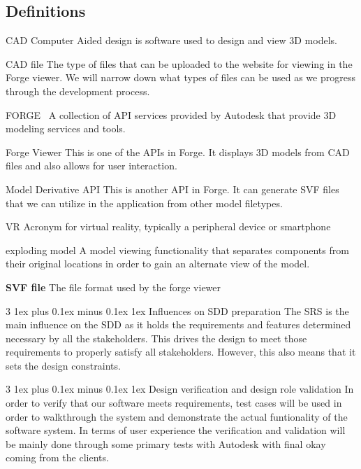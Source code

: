 \documentclass[letterpaper, 10pt, draftclsnofoot, compsoc, onecolumn]{IEEEtran}
\makeatletter
\def\subsubsection{\@startsection{subsubsection}%
                                 {3}%
                                 {\z@}%
                                 {1ex plus 0.1ex minus 0.1ex}%
                                 {1ex}%
                                 {\normalfont\normalsize}}%
\makeatother
\begin{document}
\subsection{Definitions}
\begin{description}
	\item{CAD} Computer Aided design is software used to design and view 3D models.

	\item{CAD file} The type of files that can be uploaded to the website for viewing in the Forge viewer. 
	We will  narrow down what types of files can be used as we progress through the development process.

	\item{FORGE}~\cite{forge2016} A collection of API services provided by Autodesk that provide 3D modeling services and tools.

	\item{Forge Viewer} This is one of the APIs in Forge. It displays 3D models from CAD files and also allows
	for user interaction.
	
	\item{Model Derivative API} This is another API in Forge. It can generate SVF files that we can utilize in the application from other model filetypes.
	
	\item{VR} Acronym for virtual reality, typically a peripheral device or smartphone

	\item{exploding model} A model viewing functionality that separates components from their original locations in order to gain an alternate view of the model.

	\item\textbf{SVF file} The file format used by the forge viewer
\end{description} 




\subsubsection{Influences on SDD preparation}
The SRS is the main influence on the SDD as it holds the requirements and features determined necessary by all the stakeholders. This drives the design to meet those requirements to properly satisfy all stakeholders. However, this also means that it sets the design constraints.

\subsubsection{Design verification and design role validation}
In order to verify that our software meets requirements, test cases will be used in order to walkthrough the system and demonstrate the actual funtionality of the software system. In terms of user experience the verification and validation will be mainly done through some primary tests with Autodesk with final okay coming from the clients.
\end{document}
